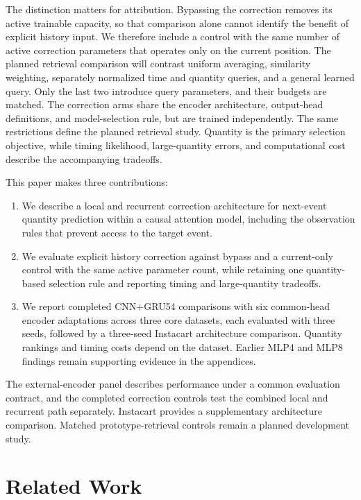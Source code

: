 \documentclass[runningheads]{llncs}
\begin{document}
The distinction matters for attribution. Bypassing the correction removes its active trainable capacity, so that comparison alone cannot identify the benefit of explicit history input. We therefore include a control with the same number of active correction parameters that operates only on the current position. The planned retrieval comparison will contrast uniform averaging, similarity weighting, separately normalized time and quantity queries, and a general learned query. Only the last two introduce query parameters, and their budgets are matched. The correction arms share the encoder architecture, output-head definitions, and model-selection rule, but are trained independently. The same restrictions define the planned retrieval study. Quantity is the primary selection objective, while timing likelihood, large-quantity errors, and computational cost describe the accompanying tradeoffs.

This paper makes three contributions:
\begin{enumerate}
\item We describe a local and recurrent correction architecture for next-event quantity prediction within a causal attention model, including the observation rules that prevent access to the target event.
\item We evaluate explicit history correction against bypass and a current-only control with the same active parameter count, while retaining one quantity-based selection rule and reporting timing and large-quantity tradeoffs.
\item We report completed CNN+GRU54 comparisons with six common-head encoder adaptations across three core datasets, each evaluated with three seeds, followed by a three-seed Instacart architecture comparison. Quantity rankings and timing costs depend on the dataset. Earlier MLP4 and MLP8 findings remain supporting evidence in the appendices.
\end{enumerate}
The external-encoder panel describes performance under a common evaluation contract, and the completed correction controls test the combined local and recurrent path separately. Instacart provides a supplementary architecture comparison. Matched prototype-retrieval controls remain a planned development study.

\section{Related Work}
\end{document}
